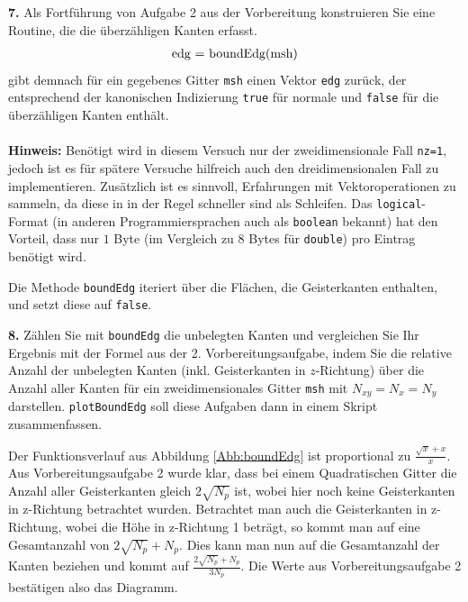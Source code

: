 \documentclass[Protokollheft.tex]{subfiles}
\begin{document}
        \begin{framed}
	\noindent \textbf{7.} Als Fortführung von Aufgabe 2 aus der Vorbereitung
                    konstruieren Sie eine Routine, die die überzähligen Kanten erfasst.
                    \begin{align}
                        \lstinline{edg = boundEdg(msh)}
                    \end{align}
                    gibt demnach für ein gegebenes Gitter \lstinline{msh} einen Vektor \lstinline{edg} zurück, der
                    entsprechend der kanonischen Indizierung \lstinline{true} für normale und \lstinline{false}
                    für die überzähligen Kanten enthält.\\
                    \ \\
                    {\textbf{Hinweis:}} Benötigt wird in diesem Versuch nur der zweidimensionale Fall \lstinline{nz=1}, jedoch ist es für spätere Versuche hilfreich auch den dreidimensionalen Fall zu implementieren. Zusätzlich ist es sinnvoll, Erfahrungen mit Vektoroperationen zu sammeln, da diese in \matlab in der Regel schneller sind als Schleifen. Das \lstinline{logical}-Format (in anderen Programmiersprachen auch als \lstinline{boolean} bekannt) hat den Vorteil, dass nur $1$ Byte (im Vergleich zu $8$ Bytes für \lstinline{double}) pro Eintrag benötigt wird.\label{exer:boundEdg}
\end{framed}
\noindent
Die Methode \lstinline{boundEdg} iteriert über die Flächen, die Geisterkanten enthalten, und setzt diese auf \lstinline{false}.
        \begin{framed}
	\noindent \textbf{8.} Zählen Sie mit \lstinline{boundEdg} die unbelegten Kanten und vergleichen Sie Ihr Ergebnis mit
                    der Formel aus der 2. Vorbereitungsaufgabe, indem Sie die relative Anzahl der
                    unbelegten Kanten (inkl. Geisterkanten in $z$-Richtung) über die Anzahl aller Kanten für ein zweidimensionales Gitter \lstinline{msh} mit $N_{xy}=N_x=N_y$ darstellen. \lstinline{plotBoundEdg} soll diese Aufgaben dann in einem Skript zusammenfassen.\label{exer:plotBoundEdg}
\end{framed}
\noindent
	Der Funktionsverlauf aus Abbildung \ref{Abb:boundEdg} ist proportional zu $\frac{\sqrt{x}+x}{x}$. Aus Vorbereitungsaufgabe 2 wurde klar, dass bei einem Quadratischen Gitter die Anzahl aller Geisterkanten gleich $2\sqrt{N_p}$ ist, wobei hier noch keine Geisterkanten in z-Richtung betrachtet wurden. Betrachtet man auch die Geisterkanten in z-Richtung, wobei die Höhe in z-Richtung 1 beträgt, so kommt man auf eine Gesamtanzahl von $2\sqrt{N_p}+N_p$. Dies kann man nun auf die Gesamtanzahl der Kanten beziehen und kommt auf $\frac{2\sqrt{N_p}+N_p}{3N_p}$. Die Werte aus Vorbereitungsaufgabe 2 bestätigen also das Diagramm.
\end{document}
